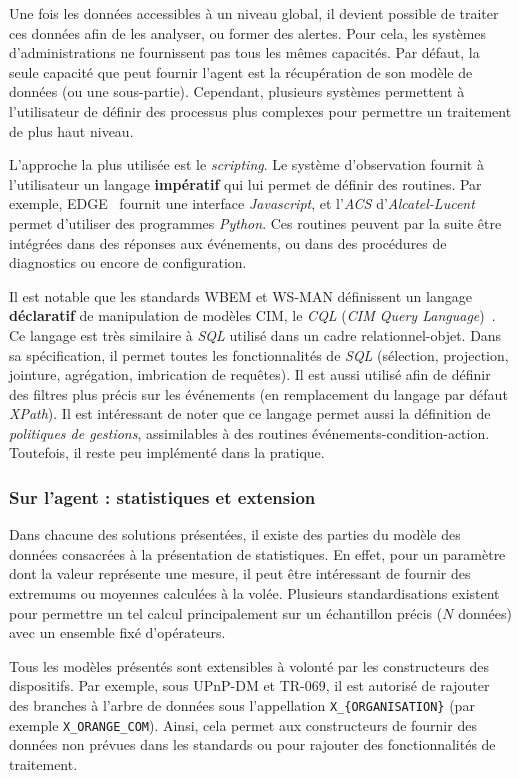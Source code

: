 Une fois les données accessibles à un niveau global, il devient possible de traiter ces données afin de les analyser, ou former des alertes. Pour cela, les systèmes d'administrations ne fournissent pas tous les mêmes capacités. Par défaut, la seule capacité que peut fournir l'agent est la récupération de son modèle de données (ou une sous-partie). Cependant, plusieurs systèmes permettent à l'utilisateur de définir des processus plus complexes pour permettre un traitement de plus haut niveau.

L'approche la plus utilisée est le \textit{scripting}. Le système d'observation fournit à l'utilisateur un langage \textbf{impératif} qui lui permet de définir des routines. Par exemple, EDGE~\cite{Motorola:EDGE} fournit une interface \textit{Javascript}, et l'\textit{ACS} d'\textit{Alcatel-Lucent} permet d'utiliser des programmes \textit{Python}. Ces routines peuvent par la suite être intégrées dans des réponses aux événements, ou dans des procédures de diagnostics ou encore de configuration.

Il est notable que les standards WBEM et WS-MAN définissent un langage \textbf{déclaratif} de manipulation de modèles CIM, le \textit{CQL} (\textit{CIM Query Language})~\cite{DMTF:CIM-QL}. Ce langage est très similaire à \textit{SQL} utilisé dans un cadre relationnel-objet. Dans sa spécification, il permet toutes les fonctionnalités de \textit{SQL} (sélection, projection, jointure, agrégation, imbrication de requêtes). Il est aussi utilisé afin de définir des filtres plus précis sur les événements (en remplacement du langage par défaut \textit{XPath}). Il est intéressant de noter que ce langage permet aussi la définition de \textit{politiques de gestions}, assimilables à des routines événements-condition-action. Toutefois, il reste peu implémenté dans la pratique.

\subsubsection{Sur l'agent : statistiques et extension}
Dans chacune des solutions présentées, il existe des parties du modèle des données consacrées à la présentation de statistiques. En effet, pour un paramètre dont la valeur représente une mesure, il peut être intéressant de fournir des extremums ou moyennes calculées à la volée. Plusieurs standardisations existent pour permettre un tel calcul principalement sur un échantillon précis ($N$ données) avec un ensemble fixé d'opérateurs.

Tous les modèles présentés sont extensibles à volonté par les constructeurs des dispositifs. Par exemple, sous UPnP-DM et TR-069, il est autorisé de rajouter des branches à l'arbre de données sous l'appellation \verb|X_{ORGANISATION}| (par exemple \verb|X_ORANGE_COM|). Ainsi, cela permet aux constructeurs de fournir des données non prévues dans les standards ou pour rajouter des fonctionnalités de traitement.


